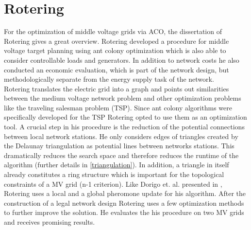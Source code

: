 \section{Rotering}
For the optimization of middle voltage grids via ACO, the dissertation of Rotering \cite{rotering2013zielnetzplanung} gives a great overview.
Rotering developed a procedure for middle voltage target planning using ant colony optimization which is also able to consider controllable loads and generators. In addition to network costs he also conducted an economic evaluation, which is part of the network design, but methodologically separate from the energy supply task of the network.\\
Rotering translates the electric grid into a graph and points out similarities between the medium voltage network problem and other optimization problems like the traveling salesman problem (TSP). Since ant colony algorithms were specifically developed for the TSP Rotering opted to use them as an optimization tool. A crucial step in his procedure is the reduction of the potential connections between local network stations. He only considers edges of triangles created by the Delaunay triangulation as potential lines between networks stations. This dramatically reduces the search space and therefore reduces the runtime of the algorithm (further details in \ref{triangulation}). In addition, a triangle in itself already constitutes a ring structure which is important for the topological constraints of a MV grid (n-1 criterion). Like Dorigo et. al. presented in \cite{ant_coloy_system}, Rotering uses a local and a global pheromone update for his algorithm. After the construction of a legal network design Rotering uses a few optimization methods to further improve the solution. He evaluates the his procedure on two MV grids and receives promising results.





